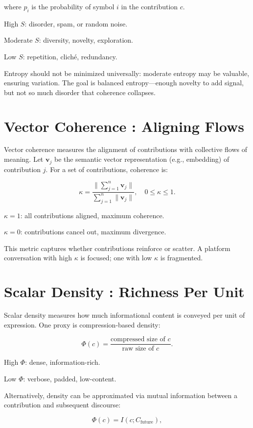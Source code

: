 \documentclass{book}
\begin{document}
where \( p_i \) is the probability of symbol \( i \) in the contribution \( c \).

High \( S \): disorder, spam, or random noise.

Moderate \( S \): diversity, novelty, exploration.

Low \( S \): repetition, cliché, redundancy.

Entropy should not be minimized universally: moderate entropy may be valuable, ensuring variation. The goal is balanced entropy—enough novelty to add signal, but not so much disorder that coherence collapses.

\section{Vector Coherence : Aligning Flows}

Vector coherence measures the alignment of contributions with collective flows of meaning. Let \( \mathbf{v}_j \) be the semantic vector representation (e.g., embedding) of contribution \( j \). For a set of contributions, coherence is:

\[ \kappa = \frac{\|\sum_{j=1}^n \mathbf{v}_j\|}{\sum_{j=1}^n \|\mathbf{v}_j\|}, \quad 0 \leq \kappa \leq 1. \]

\( \kappa = 1 \): all contributions aligned, maximum coherence.

\( \kappa = 0 \): contributions cancel out, maximum divergence.

This metric captures whether contributions reinforce or scatter. A platform conversation with high \( \kappa \) is focused; one with low \( \kappa \) is fragmented.

\section{Scalar Density : Richness Per Unit}

Scalar density measures how much informational content is conveyed per unit of expression. One proxy is compression-based density:

\[ \Phi(c) = \frac{\text{compressed size of } c}{\text{raw size of } c}. \]

High \( \Phi \): dense, information-rich.

Low \( \Phi \): verbose, padded, low-content.

Alternatively, density can be approximated via mutual information between a contribution and subsequent discourse:

\[ \Phi(c) = I(c; C_{\text{future}}), \]
\end{document}

